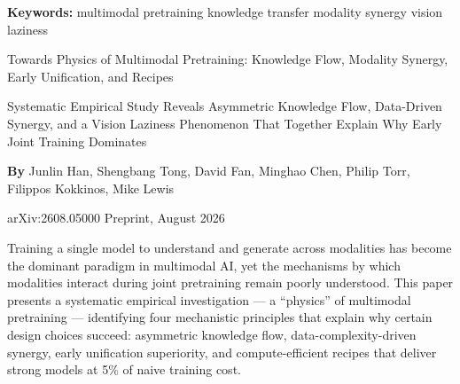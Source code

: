 \documentclass[10pt,twocolumn]{article}
\begin{document}
\setlength{\parindent}{0pt}
\setlength{\parskip}{4pt}

{\small\color{keywordgray}\textbf{Keywords:}
  multimodal pretraining \textbullet{}
  knowledge transfer \textbullet{}
  modality synergy \textbullet{}
  vision laziness}\par\vspace{4pt}

{\LARGE\bfseries\raggedright
  Towards Physics of Multimodal Pretraining:
  Knowledge Flow, Modality Synergy, Early
  Unification, and Recipes}\par\vspace{4pt}

{\large\itshape\raggedright
  Systematic Empirical Study Reveals Asymmetric Knowledge Flow,
  Data-Driven Synergy, and a Vision Laziness Phenomenon That
  Together Explain Why Early Joint Training Dominates}\par\vspace{6pt}

{\small\textbf{By} Junlin Han, Shengbang Tong, David Fan, Minghao Chen,
  Philip Torr, Filippos Kokkinos, Mike Lewis}\par\vspace{2pt}

{\small\color{keywordgray}arXiv:2608.05000 \textbullet{} Preprint, August 2026}
\par\vspace{2pt}\noindent{\color{rulered}\rule{\columnwidth}{0.6pt}}\vspace{6pt}

Training a single model to understand and generate across modalities has become the
dominant paradigm in multimodal AI, yet the mechanisms by which modalities interact
during joint pretraining remain poorly understood. This paper presents a systematic
empirical investigation — a ``physics'' of multimodal pretraining — identifying four
mechanistic principles that explain why certain design choices succeed: asymmetric
knowledge flow, data-complexity-driven synergy, early unification superiority, and
compute-efficient recipes that deliver strong models at 5\% of naive training cost.
\end{document}
